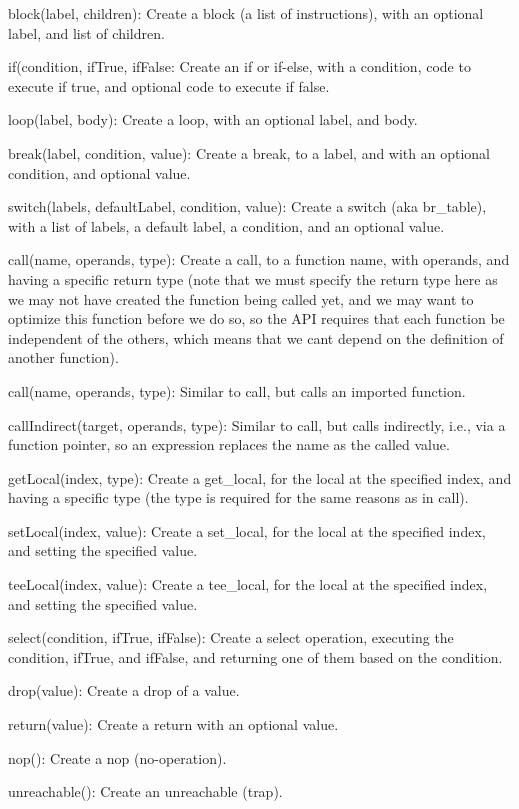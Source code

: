 \begin{DoxyItemize}
\item {\ttfamily block(label, children)}\+: Create a block (a list of instructions), with an optional label, and list of children.
\item {\ttfamily if(condition, if\+True, if\+False}\+: Create an if or if-\/else, with a condition, code to execute if true, and optional code to execute if false.
\item {\ttfamily loop(label, body)}\+: Create a loop, with an optional label, and body.
\item {\ttfamily break(label, condition, value)}\+: Create a break, to a label, and with an optional condition, and optional value.
\item {\ttfamily switch(labels, default\+Label, condition, value)}\+: Create a switch (aka br\+\_\+table), with a list of labels, a default label, a condition, and an optional value.
\item {\ttfamily call(name, operands, type)}\+: Create a call, to a function name, with operands, and having a specific return type (note that we must specify the return type here as we may not have created the function being called yet, and we may want to optimize this function before we do so, so the A\+PI requires that each function be independent of the others, which means that we can\textquotesingle{}t depend on the definition of another function).
\item {\ttfamily call(name, operands, type)}\+: Similar to {\ttfamily call}, but calls an imported function.
\item {\ttfamily call\+Indirect(target, operands, type)}\+: Similar to {\ttfamily call}, but calls indirectly, i.\+e., via a function pointer, so an expression replaces the name as the called value.
\item {\ttfamily get\+Local(index, type)}\+: Create a get\+\_\+local, for the local at the specified index, and having a specific type (the type is required for the same reasons as in {\ttfamily call}).
\item {\ttfamily set\+Local(index, value)}\+: Create a set\+\_\+local, for the local at the specified index, and setting the specified value.
\item {\ttfamily tee\+Local(index, value)}\+: Create a tee\+\_\+local, for the local at the specified index, and setting the specified value.
\item {\ttfamily select(condition, if\+True, if\+False)}\+: Create a select operation, executing the condition, if\+True, and if\+False, and returning one of them based on the condition.
\item {\ttfamily drop(value)}\+: Create a drop of a value.
\item {\ttfamily return(value)}\+: Create a return with an optional value.
\item {\ttfamily nop()}\+: Create a nop (no-\/operation).
\item {\ttfamily unreachable()}\+: Create an unreachable (trap).
\end{DoxyItemize}

